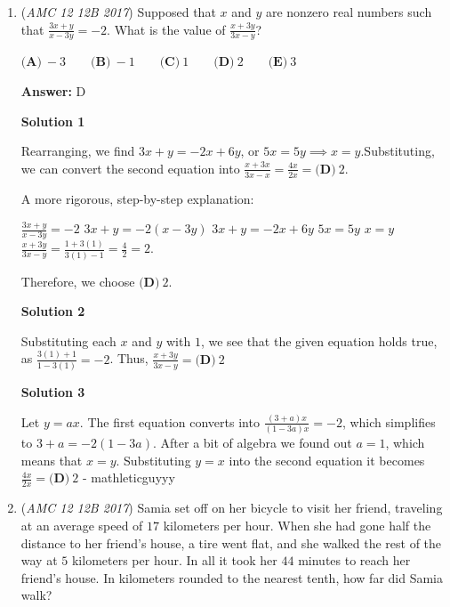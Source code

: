 \begin{enumerate}
 $\textbf{(D)}$ The same logic as above, but when $-\frac{1}{2}<y<0$ this time.

 


	\item (\textit{AMC 12 12B 2017}) Supposed that $x$ and $y$ are nonzero real numbers such that $\frac{3x+y}{x-3y}=-2$. What is the value of $\frac{x+3y}{3x-y}$?


 $\textbf{(A)}\ -3\qquad\textbf{(B)}\ -1\qquad\textbf{(C)}\ 1\qquad\textbf{(D)}\ 2\qquad\textbf{(E)}\ 3$

 \textbf{Answer: }D



\textbf{Solution 1}

Rearranging, we find $3x+y=-2x+6y$, or $5x=5y\implies x=y$.Substituting, we can convert the second equation into $\frac{x+3x}{3x-x}=\frac{4x}{2x}=\boxed{\textbf{(D)}\ 2}$.

 


 A more rigorous, step-by-step explanation:

 $\frac{3x+y}{x-3y}=-2$
$3x+y=-2\left(x-3y\right)$
$3x+y=-2x+6y$
$5x=5y$
$x=y$
$\frac{x+3y}{3x-y}=\frac{1+3\left(1\right)}{3\left(1\right)-1}=\frac{4}{2}=2$.

 Therefore, we choose $\boxed{\textbf{(D)}\ 2}$.

 



\textbf{Solution 2}

Substituting each $x$ and $y$ with $1$, we see that the given equation holds true, as $\frac{3(1)+1}{1-3(1)} = -2$. Thus, $\frac{x+3y}{3x-y}=\boxed{\textbf{(D)}\ 2}$




\textbf{Solution 3}

Let $y=ax$. The first equation converts into $\frac{(3+a)x}{(1-3a)x}=-2$, which simplifies to $3+a=-2(1-3a)$. After a bit of algebra we found out $a=1$, which means that $x=y$. Substituting $y=x$ into the second equation it becomes $\frac{4x}{2x}=\boxed{\textbf{(D)}\ 2}$ - mathleticguyyy

 


	\item (\textit{AMC 12 12B 2017}) Samia set off on her bicycle to visit her friend, traveling at an average speed of $17$ kilometers per hour. When she had gone half the distance to her friend's house, a tire went flat, and she walked the rest of the way at $5$ kilometers per hour. In all it took her $44$ minutes to reach her friend's house. In kilometers rounded to the nearest tenth, how far did Samia walk?



\end{enumerate}
